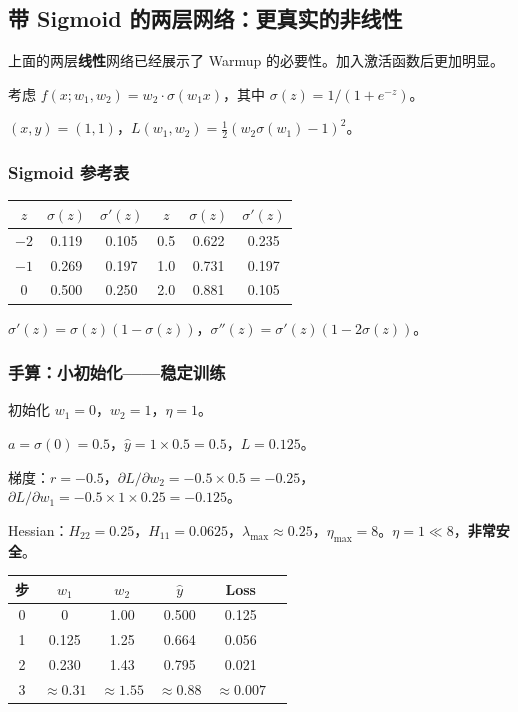 \documentclass[12pt, a4paper]{ctexart}
\begin{document}
\subsection{带 Sigmoid 的两层网络：更真实的非线性}

上面的两层\textbf{线性}网络已经展示了 Warmup 的必要性。加入激活函数后更加明显。

考虑 $f(x; w_1, w_2) = w_2 \cdot \sigma(w_1 x)$，其中 $\sigma(z) = 1/(1+e^{-z})$。

$(x,y) = (1,1)$，$L(w_1,w_2) = \frac{1}{2}(w_2\sigma(w_1) - 1)^2$。

\subsubsection{Sigmoid 参考表}

\begin{center}
\begin{tabular}{c|cc||c|cc}
$z$ & $\sigma(z)$ & $\sigma'(z)$ & $z$ & $\sigma(z)$ & $\sigma'(z)$ \\
\hline
$-2$ & 0.119 & 0.105 & 0.5 & 0.622 & 0.235 \\
$-1$ & 0.269 & 0.197 & 1.0 & 0.731 & 0.197 \\
$0$ & 0.500 & 0.250 & 2.0 & 0.881 & 0.105 \\
\end{tabular}
\end{center}

$\sigma'(z) = \sigma(z)(1-\sigma(z))$，$\sigma''(z) = \sigma'(z)(1-2\sigma(z))$。

\subsubsection{手算：小初始化——稳定训练}

初始化 $w_1 = 0$，$w_2 = 1$，$\eta = 1$。

$a = \sigma(0) = 0.5$，$\hat{y} = 1 \times 0.5 = 0.5$，$L = 0.125$。

梯度：$r = -0.5$，$\partial L/\partial w_2 = -0.5 \times 0.5 = -0.25$，$\partial L/\partial w_1 = -0.5 \times 1 \times 0.25 = -0.125$。

Hessian：$H_{22} = 0.25$，$H_{11} = 0.0625$，$\lambda_{\max} \approx 0.25$，$\eta_{\max} = 8$。$\eta = 1 \ll 8$，\textbf{非常安全}。

\begin{center}
\begin{tabular}{c|cc|cc|c}
步 & $w_1$ & $w_2$ & $\hat{y}$ & Loss \\
\hline
0 & 0 & 1.00 & 0.500 & 0.125 \\
1 & 0.125 & 1.25 & 0.664 & 0.056 \\
2 & 0.230 & 1.43 & 0.795 & 0.021 \\
3 & $\approx 0.31$ & $\approx 1.55$ & $\approx 0.88$ & $\approx 0.007$ \\
\end{tabular}
\end{center}
\end{document}

